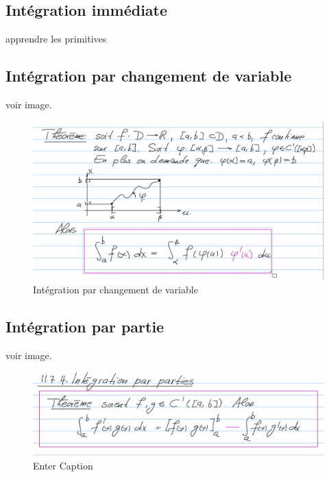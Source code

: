 \documentclass{article}
\begin{document}
\subsection{Intégration immédiate}

apprendre les primitives

\newpage

\subsection{Intégration par changement de variable}

voir image.

\begin{figure}
    \centering
    \includegraphics[width=1\linewidth]{image.png}
    \caption{Intégration par changement de variable}
    \label{fig:enter-label}
\end{figure}

\subsection{Intégration par partie}

voir image.

\begin{figure}
    \centering
    \includegraphics[width=1\linewidth]{partie.png}
    \caption{Enter Caption}
    \label{fig:enter-label}
\end{figure}
\end{document}
